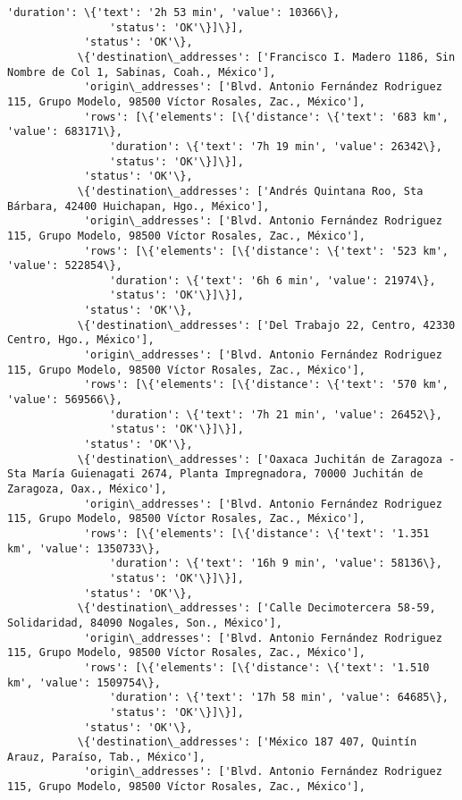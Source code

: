 \documentclass[11pt]{article}
\begin{document}
\begin{Verbatim}[commandchars=\\\{\}]
                'duration': \{'text': '2h 53 min', 'value': 10366\},
                'status': 'OK'\}]\}],
            'status': 'OK'\},
           \{'destination\_addresses': ['Francisco I. Madero 1186, Sin Nombre de Col 1, Sabinas, Coah., México'],
            'origin\_addresses': ['Blvd. Antonio Fernández Rodriguez 115, Grupo Modelo, 98500 Víctor Rosales, Zac., México'],
            'rows': [\{'elements': [\{'distance': \{'text': '683 km', 'value': 683171\},
                'duration': \{'text': '7h 19 min', 'value': 26342\},
                'status': 'OK'\}]\}],
            'status': 'OK'\},
           \{'destination\_addresses': ['Andrés Quintana Roo, Sta Bárbara, 42400 Huichapan, Hgo., México'],
            'origin\_addresses': ['Blvd. Antonio Fernández Rodriguez 115, Grupo Modelo, 98500 Víctor Rosales, Zac., México'],
            'rows': [\{'elements': [\{'distance': \{'text': '523 km', 'value': 522854\},
                'duration': \{'text': '6h 6 min', 'value': 21974\},
                'status': 'OK'\}]\}],
            'status': 'OK'\},
           \{'destination\_addresses': ['Del Trabajo 22, Centro, 42330 Centro, Hgo., México'],
            'origin\_addresses': ['Blvd. Antonio Fernández Rodriguez 115, Grupo Modelo, 98500 Víctor Rosales, Zac., México'],
            'rows': [\{'elements': [\{'distance': \{'text': '570 km', 'value': 569566\},
                'duration': \{'text': '7h 21 min', 'value': 26452\},
                'status': 'OK'\}]\}],
            'status': 'OK'\},
           \{'destination\_addresses': ['Oaxaca Juchitán de Zaragoza - Sta María Guienagati 2674, Planta Impregnadora, 70000 Juchitán de Zaragoza, Oax., México'],
            'origin\_addresses': ['Blvd. Antonio Fernández Rodriguez 115, Grupo Modelo, 98500 Víctor Rosales, Zac., México'],
            'rows': [\{'elements': [\{'distance': \{'text': '1.351 km', 'value': 1350733\},
                'duration': \{'text': '16h 9 min', 'value': 58136\},
                'status': 'OK'\}]\}],
            'status': 'OK'\},
           \{'destination\_addresses': ['Calle Decimotercera 58-59, Solidaridad, 84090 Nogales, Son., México'],
            'origin\_addresses': ['Blvd. Antonio Fernández Rodriguez 115, Grupo Modelo, 98500 Víctor Rosales, Zac., México'],
            'rows': [\{'elements': [\{'distance': \{'text': '1.510 km', 'value': 1509754\},
                'duration': \{'text': '17h 58 min', 'value': 64685\},
                'status': 'OK'\}]\}],
            'status': 'OK'\},
           \{'destination\_addresses': ['México 187 407, Quintín Arauz, Paraíso, Tab., México'],
            'origin\_addresses': ['Blvd. Antonio Fernández Rodriguez 115, Grupo Modelo, 98500 Víctor Rosales, Zac., México'],

\end{Verbatim}
\end{document}
